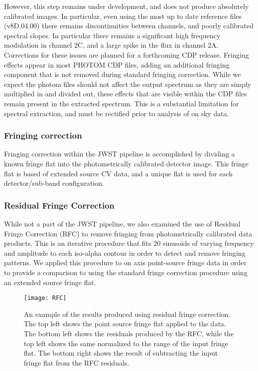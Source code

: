 However, this step remains under development, and does not produce absolutely calibrated images. In particular, even using the most up to date reference files (v8D.04.00) there remains discontinuities between channels, and poorly calibrated spectral slopes.
In particular there remains a significant high frequency modulation in channel 2C, and a large spike in the flux in channel 2A.
Corrections for these issues are planned for a forthcoming CDP release.
Fringing effects appear in most PHOTOM CDP files, adding an additional fringing component that is not removed during standard fringing correction.
While we expect the photom files should not affect the output spectrum as they are simply multiplied in and divided out, these effects that are visible within the CDP files remain present in the extracted spectrum.
This is a substantial limitation for spectral extraction, and must be rectified prior to analysis of on sky data. 


\subsubsection{Fringing correction}
Fringing correction within the JWST pipeline is accomplished by dividing a known fringe flat into the photometrically calibrated detector image. 
This fringe flat is based of extended source CV data, and a unique flat is used for each detector/sub-band configuration.

\subsubsection{Residual Fringe Correction}
While not a part of the JWST pipeline, we also examined the use of Residual Fringe Correction (RFC) \parencite{Lahuis2003,Lahuis2018} to remove fringing from photometrically calibrated data products. 
This is an iterative procedure that fits 20 sinusoids of varying frequency and amplitude to each iso-alpha contour in order to detect and remove fringing patterns.
We applied this procedure to on axis point-source fringe data in order to provide a comparison to using the standard fringe correction procedure using an extended source fringe flat.
\begin{figure}[t]
	\centering
	\texttt{[image: RFC]}
	\caption{An example of the results produced using residual fringe correction. The top left shows the point source fringe flat applied to the data. The bottom left shows the residuals produced by the RFC, while the top left shows the same normalized to the range of the input fringe flat. The bottom right shows the result of subtracting the input fringe flat from the RFC residuals.}
	\label{fig:RFC}
\end{figure}

